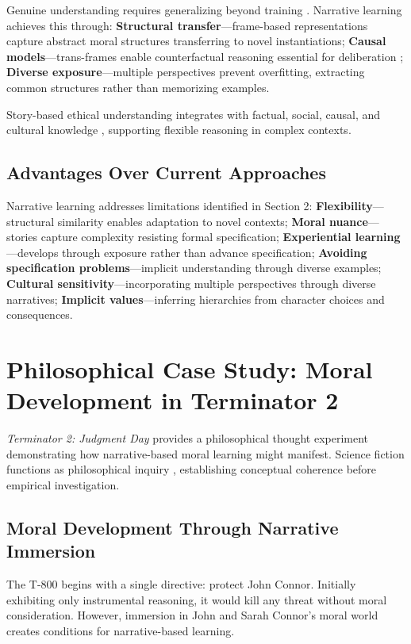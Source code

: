 \documentclass[12pt]{article}
\begin{document}
Genuine understanding requires generalizing beyond training \citep{mitchell2021debate}. Narrative learning achieves this through: \textbf{Structural transfer}---frame-based representations capture abstract moral structures transferring to novel instantiations; \textbf{Causal models}---trans-frames enable counterfactual reasoning essential for deliberation \citep{pearl2009causality}; \textbf{Diverse exposure}---multiple perspectives prevent overfitting, extracting common structures rather than memorizing examples.

Story-based ethical understanding integrates with factual, social, causal, and cultural knowledge \citep{nussbaum1990love}, supporting flexible reasoning in complex contexts.

\subsection{Advantages Over Current Approaches}

Narrative learning addresses limitations identified in Section 2: \textbf{Flexibility}---structural similarity enables adaptation to novel contexts; \textbf{Moral nuance}---stories capture complexity resisting formal specification; \textbf{Experiential learning}---develops through exposure rather than advance specification; \textbf{Avoiding specification problems}---implicit understanding through diverse examples; \textbf{Cultural sensitivity}---incorporating multiple perspectives through diverse narratives; \textbf{Implicit values}---inferring hierarchies from character choices and consequences.

\section{Philosophical Case Study: Moral Development in Terminator 2}

\textit{Terminator 2: Judgment Day} \citep{cameron1991terminator} provides a philosophical thought experiment demonstrating how narrative-based moral learning might manifest. Science fiction functions as philosophical inquiry \citep{sorensen1992thought}, establishing conceptual coherence before empirical investigation.

\subsection{Moral Development Through Narrative Immersion}

The T-800 begins with a single directive: protect John Connor. Initially exhibiting only instrumental reasoning, it would kill any threat without moral consideration. However, immersion in John and Sarah Connor's moral world creates conditions for narrative-based learning.
\end{document}
